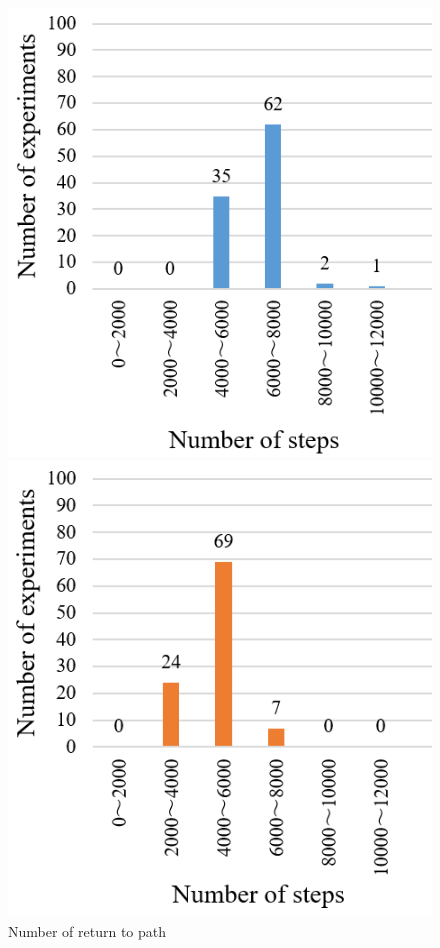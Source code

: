 \documentclass{jarticle}
\begin{document}
\begin{figure}[htbp]
  \begin{minipage}[t]{0.5\linewidth}
    \centering
    \includegraphics[keepaspectratio, scale=0.23]{./png/c.png}
  \end{minipage}
  \begin{minipage}[t]{0.5\linewidth}
    \centering
    \includegraphics[keepaspectratio, scale=0.23]{./png/p.png}
  \end{minipage}\vspace*{2mm}
  \caption{Number of return to path}
\end{figure}
\end{document}
